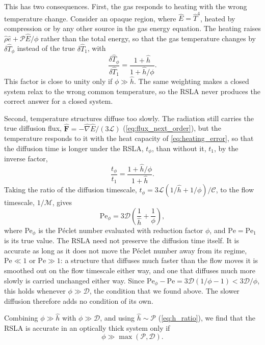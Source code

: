 \documentclass[preprint,12pt,authoryear]{elsarticle}
\newcommand{\hrho}{\hat{\rho}}
\newcommand{\he}{\hat{e}}
\newcommand{\hE}{\hat{E}}
\newcommand{\hnabla}{\hat{\nabla}}
\newcommand{\hT}{\hat{T}}
\newcommand{\hvecF}{\hat{\mathbf{F}}}
\newcommand{\calC}{\mathcal{C}}
\newcommand{\calP}{\mathcal{P}}
\newcommand{\calM}{\mathcal{M}}
\newcommand{\calL}{\mathcal{L}}
\newcommand{\calD}{\mathcal{D}}
\begin{document}
This has two consequences. First, the gas responds to heating with the wrong temperature change. Consider an opaque region, where $\hE = \hT^4$, heated by compression or by any other source in the gas energy equation. The heating raises $\hrho\he + \calP\hE/\phi$ rather than the total energy, so that the gas temperature changes by $\delta\hT_\phi$ instead of the true $\delta\hT_1$, with
\begin{equation}
    \frac{\delta\hT_\phi}{\delta\hT_1} = \frac{1 + \hat{h}}{1 + \hat{h}/\phi} .
    \label{eq:heating_error}
\end{equation}
This factor is close to unity only if $\phi \gg \hat{h}$. The same weighting makes a closed system relax to the wrong common temperature, so the RSLA never produces the correct answer for a closed system.

Second, temperature structures diffuse too slowly. The radiation still carries the true diffusion flux, $\hvecF = -\hnabla\hE/(3\calL)$ (\autoref{eq:flux_next_order}), but the temperature responds to it with the heat capacity of \autoref{eq:heating_error}, so that the diffusion time is longer under the RSLA, $t_\phi$, than without it, $t_1$, by the inverse factor,
\begin{equation}
    \frac{t_\phi}{t_1} = \frac{1 + \hat{h}/\phi}{1 + \hat{h}} .
    \label{eq:slowdown}
\end{equation}
Taking the ratio of the diffusion timescale, $t_\phi = 3\calL(1/\hat{h} + 1/\phi)/\calC$, to the flow timescale, $1/\calM$, gives
\begin{equation}
    \mathrm{Pe}_\phi = 3\calD\left(\frac{1}{\hat{h}} + \frac{1}{\phi}\right),
    \label{eq:Pe_phi}
\end{equation}
where Pe$_\phi$ is the P\'eclet number evaluated with reduction factor $\phi$, and $\mathrm{Pe} = \mathrm{Pe}_1$ is its true value. The RSLA need not preserve the diffusion time itself. It is accurate as long as it does not move the P\'eclet number away from its regime, $\mathrm{Pe} \ll 1$ or $\mathrm{Pe} \gg 1$: a structure that diffuses much faster than the flow moves it is smoothed out on the flow timescale either way, and one that diffuses much more slowly is carried unchanged either way. Since $\mathrm{Pe}_\phi - \mathrm{Pe} = 3\calD(1/\phi - 1) < 3\calD/\phi$, this holds whenever $\phi \gg \calD$, the condition that we found above. The slower diffusion therefore adds no condition of its own.

Combining $\phi \gg \hat{h}$ with $\phi \gg \calD$, and using $\hat{h} \sim \calP$ (\autoref{eq:h_ratio}), we find that the RSLA is accurate in an optically thick system only if
\begin{equation}
    \phi \gg \max(\calP, \calD).
    \label{eq:rsla_valid}
\end{equation}
\end{document}
